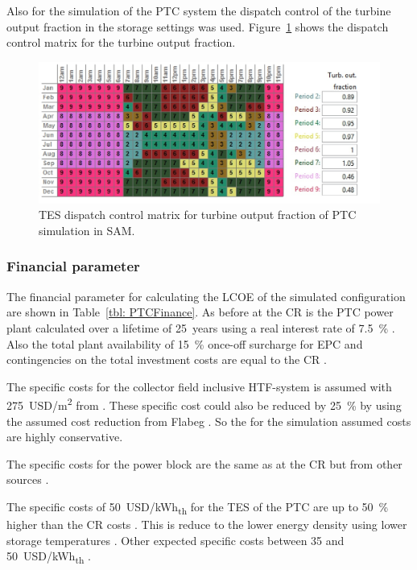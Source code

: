 Also for the simulation of the PTC system the dispatch control of the turbine output fraction in the storage settings was used. Figure~\ref{PTC_turbineoutput} shows the dispatch control matrix for the turbine output fraction.
\begin{figure}[htbp]  
\centering
\includegraphics[width=0.95\linewidth]{FIG/PTC_turbineoutput}
\caption[TES dispatch control matrix for turbine output fraction of PTC simulation in SAM.]{TES dispatch control matrix for turbine output fraction of PTC simulation in SAM.}\label{PTC_turbineoutput}
\end{figure}
\subsubsection{Financial parameter}
The financial parameter for calculating the LCOE of the simulated configuration are shown in Table~\ref{tbl: PTCFinance}. As before at the CR is the PTC power plant calculated over a lifetime of 25~years using a real interest rate of 7.5~\% \cite{FraunhoferISE2013}. Also the total plant availability of  15~\% once-off surcharge for EPC and contingencies on the total investment costs are equal to the CR \cite{Platzer2014}.


The specific costs for the collector field inclusive HTF-system is assumed with 275~USD/m\textsuperscript{2} from \cite{Morin2012}. These specific cost could also be reduced by 25~\% by using the assumed cost reduction from Flabeg \cite{FLABEG_FE_GmbH2015}. So the for the simulation assumed costs are highly conservative.

The specific costs for the power block are the same as at the CR but from other sources \cite{Platzer2014}. 

The specific costs of 50~USD/kWh\textsubscript{th} for the TES of the PTC are up to 50~\% higher than the CR costs \cite{Platzer2014}. This is reduce to the lower energy density using lower storage temperatures \cite{Steinmann2015}. Other expected specific costs between 35 and 50~USD/kWh\textsubscript{th} \cite{Steinmann2012}.

